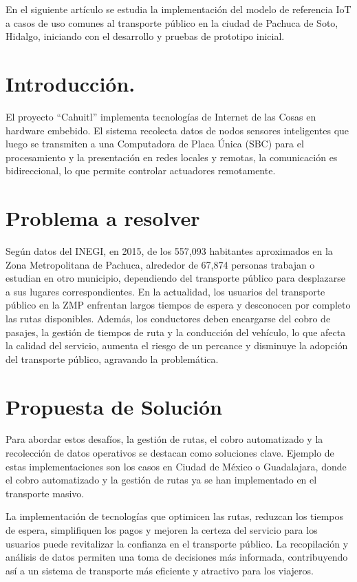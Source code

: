 \documentclass[10pt]{article}
\begin{document}
En el siguiente artículo se estudia la implementación del modelo de referencia IoT a casos de uso comunes al transporte público en la ciudad de Pachuca de Soto, Hidalgo, iniciando con el desarrollo y pruebas de prototipo inicial.
\cite{IEEEreferencias:Ref1}
\cite{IEEEreferencias:Ref2}



\section{Introducción.} 

El proyecto ``Cahuitl'' implementa tecnologías de Internet de las Cosas en hardware embebido.
El sistema recolecta datos de nodos sensores inteligentes que luego se transmiten a una Computadora de Placa Única (SBC) para el procesamiento y la presentación en redes locales y remotas, la comunicación es bidireccional, lo que permite controlar actuadores remotamente. 


\section{Problema a resolver}

Según datos del INEGI, en 2015, de los 557,093 habitantes aproximados en la Zona Metropolitana de Pachuca, alrededor de 67,874 personas trabajan o estudian en otro municipio, dependiendo del transporte público para desplazarse a sus lugares correspondientes. En la actualidad, los usuarios del transporte público en la ZMP enfrentan largos tiempos de espera y desconocen por completo las rutas disponibles. Además, los conductores deben encargarse del cobro de pasajes, la gestión de tiempos de ruta y la conducción del vehículo, lo que afecta la calidad del servicio, aumenta el riesgo de un percance y disminuye la adopción del transporte público, agravando la problemática. 
\cite{IEEEreferencias:Ref3}

\section{Propuesta de Solución}
Para abordar estos desafíos, la gestión de rutas, el cobro automatizado y la recolección de datos operativos se destacan como soluciones clave. Ejemplo de estas implementaciones son los casos en Ciudad de México o Guadalajara, donde el cobro automatizado y la gestión de rutas ya se han implementado en el transporte masivo. 

La implementación de tecnologías que optimicen las rutas, reduzcan los tiempos de espera, simplifiquen los pagos y mejoren la certeza del servicio para los usuarios puede revitalizar la confianza en el transporte público. La recopilación y análisis de datos permiten una toma de decisiones más informada, contribuyendo así a un sistema de transporte más eficiente y atractivo para los viajeros.\cite{IEEEreferencias:Ref4}\cite{IEEEreferencias:Ref5}
\end{document}
